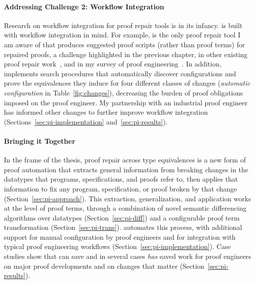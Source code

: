\paragraph{Addressing Challenge 2: Workflow Integration}
Research on workflow integration for proof repair tools is in its infancy.
\toolnamec is built with workflow integration in mind.
For example, \toolnamec is the only proof repair tool I am aware of that produces suggested proof scripts (rather than proof terms) for repaired proofs,
a challenge highlighted in the previous chapter, in other existing proof repair work~\cite{robert2018}, and in 
my survey of proof engineering~\cite{PGL-045}.
In addition, \toolnamec implements search procedures that 
automatically discover configurations and prove the equivalences they induce for four different classes of 
changes (\textit{automatic configuration} in Table~\ref{fig:changes}),
decreasing the burden of proof obligations imposed on the proof engineer.
My partnership with an industrial proof engineer has informed other changes to further improve workflow integration
(Sections~\ref{sec:pi-implementation} and~\ref{sec:pi-results}).

\paragraph{Bringing it Together}
In the frame of the thesis, proof repair across type equivalences is a new form of proof automation that extracts general information from breaking 
changes in the datatypes that programs, specifications, and proofs refer to, 
then applies that information to fix any program, specification, or proof broken by that change (Section~\ref{sec:pi-approach}).
This extraction, generalization, and application works at the level of proof terms, through a combination of novel semantic differencing algorithms over datatypes (Section~\ref{sec:pi-diff}) and a configurable proof term transformation (Section~\ref{sec:pi-trans}).
\toolnamec automates this process,
with additional support for manual configuration by proof engineers and for integration with 
typical proof engineering workflows (Section~\ref{sec:pi-implementation}).
Case studies show that \toolnamec can save and in several cases \textit{has} saved work for proof engineers on major proof developments and on
changes that matter (Section~\ref{sec:pi-results}).















